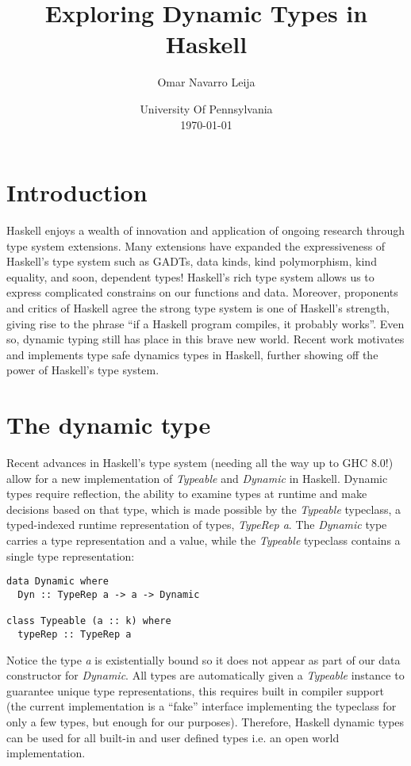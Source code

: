 \documentclass{article}
\title{Exploring Dynamic Types in Haskell}
\author {Omar Navarro Leija}
\date{%
  University Of Pennsylvania \\%
  \today
}
\begin{document}
\maketitle

\section*{Introduction}
Haskell enjoys a wealth of innovation and application of ongoing research through type system extensions. Many extensions have expanded the expressiveness of Haskell's type system such as GADTs, data kinds, kind polymorphism, kind equality, and soon, dependent types! Haskell's rich type system allows us to express complicated constrains on our functions and data. Moreover, proponents and critics of Haskell agree the strong type system is one of Haskell's strength, giving rise to the phrase ``if a Haskell program compiles, it probably works''. Even so, dynamic typing still has place in this brave new world. Recent work \cite{dynamic} motivates and implements type safe dynamics types in Haskell, further showing off the power of Haskell's type system.

\section*{The dynamic type}
Recent advances in Haskell's type system (needing all the way up to GHC 8.0!) allow for a new implementation of \textit{Typeable} and \textit{Dynamic} in Haskell. Dynamic types require reflection, the ability to examine types at runtime and make decisions based on that type, which is made possible by the \textit{Typeable} typeclass, a typed-indexed runtime representation of types, \textit{TypeRep a}. The \textit{Dynamic} type carries a type representation and a value, while the \textit{Typeable} typeclass contains a single type representation:

\begin{verbatim}
data Dynamic where
  Dyn :: TypeRep a -> a -> Dynamic

class Typeable (a :: k) where
  typeRep :: TypeRep a
\end{verbatim}
Notice the type \textit{a} is existentially bound so it does not appear as part of our data constructor for \textit{Dynamic}. All types are automatically given a \textit{Typeable} instance to guarantee unique type representations, this requires built in compiler support (the current implementation is a ``fake'' interface implementing the typeclass for only a few types, but enough for our purposes). Therefore, Haskell dynamic types can be used for all built-in and user defined types i.e. an open world implementation.
\end{document}
